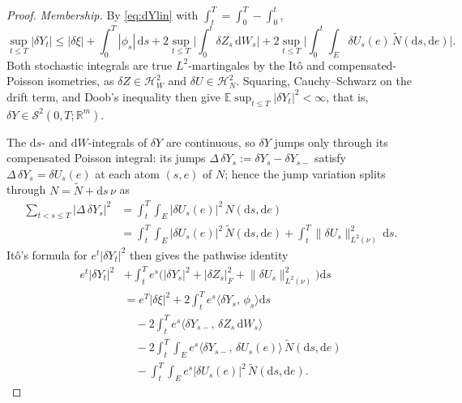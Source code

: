 \documentclass[preprint,12pt]{elsarticle}
\newcommand{\R}{\mathbb{R}}
\newcommand{\E}{\mathbb{E}}
\newcommand{\diff}{\mathrm{d}}
\newcommand{\Nt}{\widetilde{N}}
\newcommand{\inner}[2]{\langle #1,\,#2\rangle}
\newcommand{\Lnu}{L^2(\nu)}
\newcommand{\Ssp}[1]{\mathcal{S}^2(0,T;#1)}
\newcommand{\HW}{\mathcal{H}^2_W}
\newcommand{\HN}{\mathcal{H}^2_N}
\newcommand{\Lnorm}[1]{\lVert #1\rVert_{\Lnu}}
\numberwithin{equation}{section}
\theoremstyle{plain}
\theoremstyle{definition}
\theoremstyle{\PaperRemarkStyle}
\begin{document}
\begin{proof}
\emph{Membership.} By \eqref{eq:dYlin} with $\int_t^T=\int_0^T-\int_0^t$,
\[
\sup_{t\le T}|\delta Y_t|\le|\delta\xi|+\int_0^T\!|\phi_s|\,\diff s
+2\sup_{t\le T}\Big|\int_0^t\delta Z_s\,\diff W_s\Big|
+2\sup_{t\le T}\Big|\int_0^t\!\!\int_E\delta U_s(e)\,\Nt(\diff s,\diff e)\Big|.
\]
Both stochastic integrals are true $L^2$-martingales by the It\^o and
compensated-Poisson isometries, as $\delta Z\in\HW$ and $\delta U\in\HN$.
Squaring, Cauchy--Schwarz on the drift term, and Doob's inequality then give
$\E\sup_{t\le T}|\delta Y_t|^2<\infty$, that is, $\delta Y\in\Ssp{\R^m}$.

The $\diff s$- and $\diff W$-integrals of $\delta Y$ are continuous, so
$\delta Y$ jumps only through its compensated Poisson integral: its jumps
$\Delta\,\delta Y_s:=\delta Y_s-\delta Y_{s-}$ satisfy $\Delta\,\delta Y_s=\delta U_s(e)$
at each atom $(s,e)$ of $N$; hence the jump variation
splits through $N=\Nt+\diff s\,\nu$ as
\begin{align*}
\sum_{t<s\le T}|\Delta\,\delta Y_s|^2
&=\int_t^T\!\!\int_E|\delta U_s(e)|^2\,N(\diff s,\diff e)\\
&=\int_t^T\!\!\int_E|\delta U_s(e)|^2\,\Nt(\diff s,\diff e)
+\int_t^T\!\Lnorm{\delta U_s}^2\,\diff s.
\end{align*}
It\^o's formula for
$e^{t}|\delta Y_t|^2$ then gives the pathwise identity
\begin{equation}\label{eq:itoY2}
\begin{aligned}
e^{t}|\delta Y_t|^2
&+\int_t^T\!e^{s}\big(|\delta Y_s|^2+|\delta Z_s|_F^2+\Lnorm{\delta U_s}^2\big)\diff s\\
&=e^{T}|\delta\xi|^2+2\int_t^T\!e^{s}\inner{\delta Y_s}{\phi_s}\diff s\\
&\quad-2\int_t^T\!e^{s}\inner{\delta Y_{s-}}{\delta Z_s\,\diff W_s}\\
&\quad-2\int_t^T\!\!\int_E e^{s}\inner{\delta Y_{s-}}{\delta U_s(e)}\,\Nt(\diff s,\diff e)\\
&\quad-\int_t^T\!\!\int_E e^{s}|\delta U_s(e)|^2\,\Nt(\diff s,\diff e).
\end{aligned}
\end{equation}


\end{proof}
\end{document}
